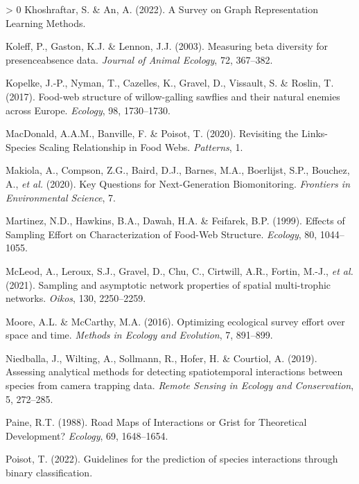 \documentclass[11pt]{article}
\newlength{\cslhangindent}
\newenvironment{CSLReferences}[3] %
 {%
  \setlength{\parindent}{0pt}
  \ifodd #1 \everypar{\setlength{\hangindent}{\cslhangindent}}\ignorespaces\fi
  \ifnum #2 > 0
  \setlength{\parskip}{#2\baselineskip}
  \fi
 }%
 {}
\begin{document}
\begin{CSLReferences}{1}{0}
\leavevmode\hypertarget{ref-Khoshraftar2022SurGra}{}%
Khoshraftar, S. \& An, A. (2022). A Survey on Graph Representation
Learning Methods.

\leavevmode\hypertarget{ref-Koleff2003MeaBet}{}%
Koleff, P., Gaston, K.J. \& Lennon, J.J. (2003). Measuring beta
diversity for presenceabsence data. \emph{Journal of Animal Ecology},
72, 367--382.

\leavevmode\hypertarget{ref-Kopelke2017FooStr}{}%
Kopelke, J.-P., Nyman, T., Cazelles, K., Gravel, D., Vissault, S. \&
Roslin, T. (2017). Food-web structure of willow-galling sawflies and
their natural enemies across Europe. \emph{Ecology}, 98, 1730--1730.

\leavevmode\hypertarget{ref-MacDonald2020RevLin}{}%
MacDonald, A.A.M., Banville, F. \& Poisot, T. (2020). Revisiting the
Links-Species Scaling Relationship in Food Webs. \emph{Patterns}, 1.

\leavevmode\hypertarget{ref-Makiola2020KeyQue}{}%
Makiola, A., Compson, Z.G., Baird, D.J., Barnes, M.A., Boerlijst, S.P.,
Bouchez, A., \emph{et al.} (2020). Key Questions for Next-Generation
Biomonitoring. \emph{Frontiers in Environmental Science}, 7.

\leavevmode\hypertarget{ref-Martinez1999EffSam}{}%
Martinez, N.D., Hawkins, B.A., Dawah, H.A. \& Feifarek, B.P. (1999).
Effects of Sampling Effort on Characterization of Food-Web Structure.
\emph{Ecology}, 80, 1044--1055.

\leavevmode\hypertarget{ref-McLeod2021SamAsy}{}%
McLeod, A., Leroux, S.J., Gravel, D., Chu, C., Cirtwill, A.R., Fortin,
M.-J., \emph{et al.} (2021). Sampling and asymptotic network properties
of spatial multi-trophic networks. \emph{Oikos}, 130, 2250--2259.

\leavevmode\hypertarget{ref-Moore2016OptEco}{}%
Moore, A.L. \& McCarthy, M.A. (2016). Optimizing ecological survey
effort over space and time. \emph{Methods in Ecology and Evolution}, 7,
891--899.

\leavevmode\hypertarget{ref-Niedballa2019AssAna}{}%
Niedballa, J., Wilting, A., Sollmann, R., Hofer, H. \& Courtiol, A.
(2019). Assessing analytical methods for detecting spatiotemporal
interactions between species from camera trapping data. \emph{Remote
Sensing in Ecology and Conservation}, 5, 272--285.

\leavevmode\hypertarget{ref-Paine1988RoaMap}{}%
Paine, R.T. (1988). Road Maps of Interactions or Grist for Theoretical
Development? \emph{Ecology}, 69, 1648--1654.

\leavevmode\hypertarget{ref-Poisot2022GuiPre}{}%
Poisot, T. (2022). Guidelines for the prediction of species interactions
through binary classification.


\end{CSLReferences}
\end{document}
